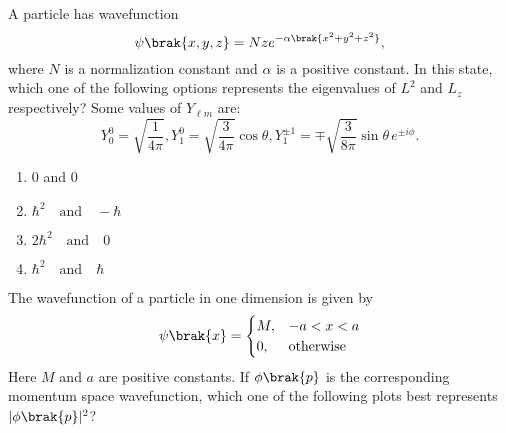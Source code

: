 \item A particle has wavefunction 
\[
	\psi\brak{x, y, z} = N z e^{-\alpha\brak{x^2 + y^2 + z^2}},
\]
where $N$ is a normalization constant and $\alpha$ is a positive constant. In this state, which one of the following options represents the eigenvalues of $L^2$ and $L_z$ respectively? Some values of $Y_{\ell m}$ are:
\[
Y_{0}^{0} = \sqrt{\frac{1}{4\pi}}, Y_{1}^{0} = \sqrt{\frac{3}{4\pi}} \cos \theta,  Y_{1}^{\pm 1} = \mp \sqrt{\frac{3}{8\pi}} \sin \theta \, e^{\pm i\phi}.
\]
\begin{enumerate}
\item 0 and 0
\item $\hbar^2 \quad \text{and} \quad -\hbar$
\item $2\hbar^2 \quad \text{and} \quad 0$
\item $\hbar^2 \quad \text{and} \quad \hbar$
\end{enumerate}
\item The wavefunction of a particle in one dimension is given by
\[
	\psi\brak{x} = 
\begin{cases} 
M, & -a < x < a \\
0, & \text{otherwise} 
\end{cases}
\]
Here $M$ and $a$ are positive constants. If $\phi\brak{p}$ is the corresponding momentum space wavefunction, which one of the following plots best represents $|\phi\brak{p}|^2$?
